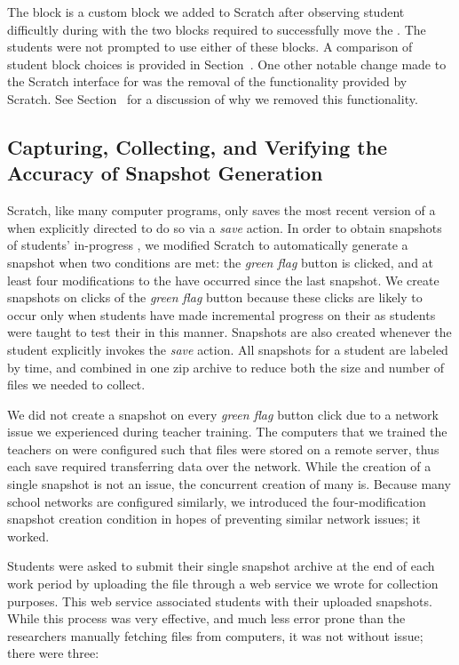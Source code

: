 The \glideto{} block is a custom block we added to Scratch after observing
student difficultly during \sone{} with the two blocks required to successfully
move the \net{}. The students were not prompted to use either of these
blocks. A comparison of student block choices is provided in
Section~. One other notable change made to the Scratch
interface for \stwo{} was the removal of the \dce{} functionality provided by
Scratch. See Section~ for a discussion of why we removed this
functionality.

\subsection{Capturing, Collecting, and Verifying the Accuracy of Snapshot Generation}

Scratch, like many computer programs, only saves the most recent version of a
\sprogram{} when explicitly directed to do so via a \emph{save} action. In
order to obtain snapshots of students' in-progress , we modified
Scratch to automatically generate a snapshot when two conditions are met: the
\emph{green flag} button is clicked, and at least four modifications to the
\sprogram{} have occurred since the last snapshot. We create snapshots on
clicks of the \emph{green flag} button because these clicks are likely to occur
only when students have made incremental progress on their  as
students were taught to test their  in this manner. Snapshots are
also created whenever the student explicitly invokes the \emph{save}
action. All snapshots for a student are labeled by time, and combined in one
zip archive to reduce both the size and number of files we needed to collect.

We did not create a snapshot on every \emph{green flag} button click due to a
network issue we experienced during teacher training. The computers that we
trained the teachers on were configured such that \sprogram{} files were stored
on a remote server, thus each save required transferring data over the
network. While the creation of a single snapshot is not an issue, the
concurrent creation of many is. Because many school networks are configured
similarly, we introduced the four-modification snapshot creation condition in
hopes of preventing similar network issues; it worked.

Students were asked to submit their single snapshot archive at the end of each
work period by uploading the file through a web service we wrote for collection
purposes. This web service associated students with their uploaded
snapshots. While this process was very effective, and much less error prone
than the researchers manually fetching files from computers, it was not without
issue; there were three:

